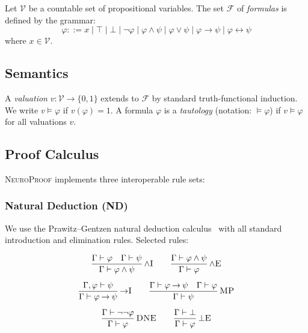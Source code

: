 \documentclass[conference]{IEEEtran}
\newcommand{\entails}{\vDash}
\newcommand{\proves}{\vdash}
\newcommand{\dland}{\mathbin{\wedge}}
\newcommand{\dlor}{\mathbin{\vee}}
\newcommand{\dlnot}{\neg}
\newcommand{\dlimp}{\mathbin{\to}}
\newcommand{\dliff}{\mathbin{\leftrightarrow}}
\newcommand{\dlbot}{\bot}
\newcommand{\dltop}{\top}
\newcommand{\Fml}{\mathcal{F}}
\newcommand{\NP}{\textsc{NeuroProof}}
\newcommand{\infrule}[3]{
  \dfrac{\displaystyle #2}{\displaystyle #3}\,\textsc{#1}
}
\begin{document}
Let $\mathcal{V}$ be a countable set of propositional variables.  The set
$\Fml$ of \emph{formulas} is defined by the grammar:
\begin{equation}
  \varphi ::= x \mid \dltop \mid \dlbot \mid \dlnot\varphi
    \mid \varphi \dland \psi \mid \varphi \dlor \psi
    \mid \varphi \dlimp \psi \mid \varphi \dliff \psi
\end{equation}
where $x \in \mathcal{V}$.

\subsection{Semantics}

A \emph{valuation} $v : \mathcal{V} \to \{0,1\}$ extends to $\Fml$ by
standard truth-functional induction.  We write $v \entails \varphi$ if
$v(\varphi) = 1$.  A formula $\varphi$ is a \emph{tautology} (notation:
$\entails \varphi$) if $v \entails \varphi$ for all valuations $v$.

\subsection{Proof Calculus}

\NP{} implements three interoperable rule sets:

\subsubsection{Natural Deduction (ND)}

We use the Prawitz--Gentzen natural deduction calculus~\cite{Prawitz1965} with
all standard introduction and elimination rules.  Selected rules:

\medskip
\begin{gather}
  \infrule{$\wedge$I}
    {\Gamma \proves \varphi \quad \Gamma \proves \psi}
    {\Gamma \proves \varphi \dland \psi}
  \qquad
  \infrule{$\wedge$E}
    {\Gamma \proves \varphi \dland \psi}
    {\Gamma \proves \varphi}
  \\[6pt]
  \infrule{$\to$I}
    {\Gamma, \varphi \proves \psi}
    {\Gamma \proves \varphi \dlimp \psi}
  \qquad
  \infrule{MP}
    {\Gamma \proves \varphi \dlimp \psi \quad \Gamma \proves \varphi}
    {\Gamma \proves \psi}
  \\[6pt]
  \infrule{DNE}
    {\Gamma \proves \dlnot\dlnot\varphi}
    {\Gamma \proves \varphi}
  \qquad
  \infrule{$\bot$E}
    {\Gamma \proves \dlbot}
    {\Gamma \proves \varphi}
\end{gather}
\end{document}
